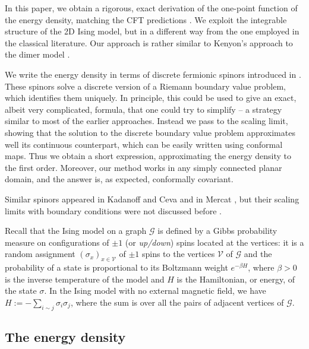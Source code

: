 \documentclass[oneside,english]{amsart}
\numberwithin{equation}{section}
\numberwithin{figure}{section}
\theoremstyle{plain}
\theoremstyle{plain}
\theoremstyle{plain}
\theoremstyle{plain}
\theoremstyle{plain}
\theoremstyle{definition}
\theoremstyle{remark}
\begin{document}
In this paper, we obtain a rigorous, exact derivation of the one-point
function of the energy density, matching the CFT predictions \cite{di-francesco-mathieu-senechal,cardy-i,burkhard-guim}.
We exploit the integrable structure of the 2D Ising model, but in
a different way from the one employed in the classical literature.
Our approach is rather similar to Kenyon's approach to the dimer model
\cite{kenyon-i}.

We write the energy density in terms of discrete fermionic spinors
introduced in \cite{smirnov-i}. These spinors solve a discrete version
of a Riemann boundary value problem, which identifies them uniquely.
In principle, this could be used to give an exact, albeit very complicated,
formula, that one could try to simplify -- a strategy similar to most
of the earlier approaches. Instead we pass to the scaling limit, showing
that the solution to the discrete boundary value problem approximates
well its continuous counterpart, which can be easily written using
conformal maps. Thus we obtain a short expression, approximating the
energy density to the first order. Moreover, our method works in any
simply connected planar domain, and the answer is, as expected, conformally
covariant.

Similar spinors appeared in Kadanoff and Ceva \cite{kadanoff-ceva}
and in Mercat \cite{mercat}, but their scaling limits with boundary
conditions were not discussed before \cite{smirnov-i}.

Recall that the Ising model on a graph $\mathcal{G}$ is defined by
a Gibbs probability measure on configurations of $\pm1$ (or \emph{up/down})
spins located at the vertices: it is a random assignment $\left(\sigma_{x}\right)_{x\in\mathcal{V}}$
of $\pm1$ spins to the vertices $\mathcal{V}$ of $\mathcal{G}$
and the probability of a state is proportional to its Boltzmann weight
$e^{-\beta H}$, where $\beta>0$ is the inverse temperature of the
model and $H$ is the Hamiltonian, or energy, of the state $\sigma$.
In the Ising model with no external magnetic field, we have $H:=-\sum_{i\sim j}\sigma_{i}\sigma_{j}$,
where the sum is over all the pairs of adjacent vertices of $\mathcal{G}$.


\subsection{The energy density}
\end{document}
